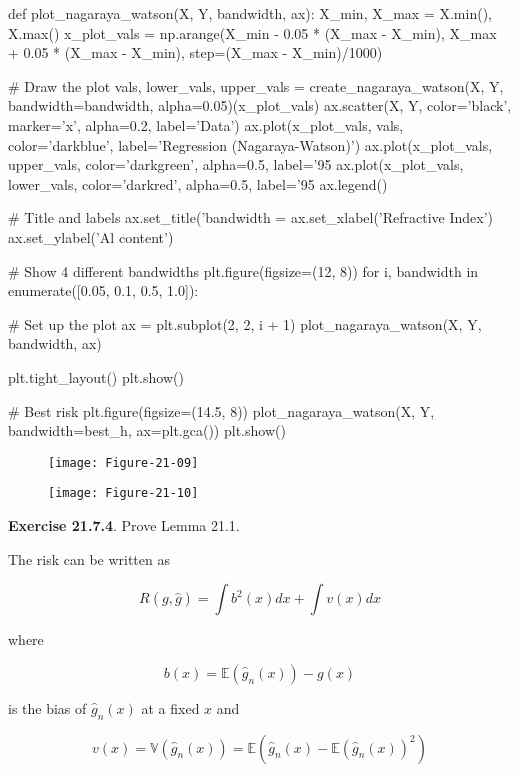 \begin{python}
def plot_{n}agaraya_watson(X, Y, bandwidth, ax):
    X_min, X_max = X.min(), X.max()
    x_plot_vals = np.arange(X_min - 0.05 * (X_max - X_min), X_max + 0.05 * (X_max - X_min), step=(X_max - X_min)/1000)
      
    # Draw the plot
    vals, lower_vals, upper_vals = create_{n}agaraya_watson(X, Y, bandwidth=bandwidth, alpha=0.05)(x_plot_vals)
    ax.scatter(X, Y, color='black', marker='x', alpha=0.2, label='Data')
    ax.plot(x_plot_vals, vals, color='darkblue', label='Regression (Nagaraya-Watson)')
    ax.plot(x_plot_vals, upper_vals, color='darkgreen', alpha=0.5, label='95%
    ax.plot(x_plot_vals, lower_vals, color='darkred', alpha=0.5, label='95%
    ax.legend()
    
    # Title and labels
    ax.set_title('bandwidth = %
    ax.set_xlabel('Refractive Index')    
    ax.set_ylabel('Al content')

# Show 4 different bandwidths
plt.figure(figsize=(12, 8))
for i, bandwidth in enumerate([0.05, 0.1, 0.5, 1.0]):
    
    # Set up the plot
    ax = plt.subplot(2, 2, i + 1)
    plot_{n}agaraya_watson(X, Y, bandwidth, ax)

plt.tight_layout()
plt.show()

# Best risk
plt.figure(figsize=(14.5, 8))
plot_{n}agaraya_watson(X, Y, bandwidth=best_h, ax=plt.gca())
plt.show()
\end{python}

\begin{figure}[H]
\centering
\texttt{[image: Figure-21-09]}
\end{figure}

\begin{figure}[H]
\centering
\texttt{[image: Figure-21-10]}
\end{figure}

\textbf{Exercise 21.7.4}. Prove Lemma 21.1.

The risk can be written as

\[ R(g, \hat{g}) = \int b^{2}(x) dx + \int v(x) dx \]

where

\[ b(x) = \mathbb{E}(\hat{g}_{n}(x)) - g(x) \]

is the bias of \(\hat{g}_{n}(x)\) at a fixed \(x\) and

\[ v(x) = \mathbb{V}(\hat{g}_{n}(x)) = \mathbb{E}\left( \hat{g}_{n}(x) - \mathbb{E}(\hat{g}_{n}(x))^{2}\right) \]

